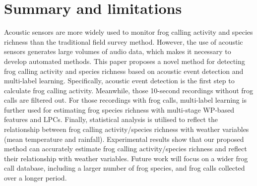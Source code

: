 \section{Summary and limitations}
Acoustic sensors are more widely used to monitor frog calling activity and species richness than the traditional field survey method. However, the use of acoustic sensors generates large volumes of audio data, which makes it necessary to develop automated methods. This paper proposes a novel method for detecting frog calling activity and species richness based on acoustic event detection and multi-label learning. Specifically,
acoustic event detection is the first step to calculate frog calling activity. Meanwhile, those 10-second recordings without frog calls are filtered out. For those recordings with frog calls, multi-label learning is further used for estimating frog species richness with multi-stage WP-based features and LPCs. Finally, statistical analysis is utilised to reflect the relationship between frog calling activity/species richness with weather variables (mean temperature and rainfall). Experimental results show that our proposed method can accurately estimate frog calling activity/species richness and reflect their relationship with weather variables. Future work will focus on a wider frog call database, including a larger number of frog species, and frog calls collected over a longer period.


